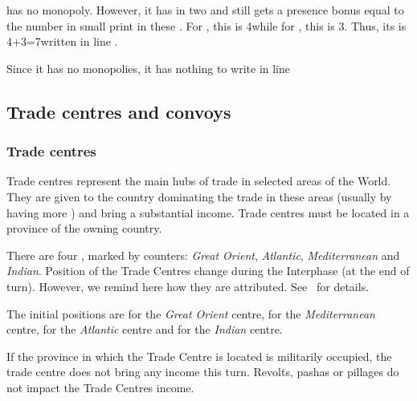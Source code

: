 \begin{exemple}
  \POR has no monopoly. However, it has \TradeFLEET in two \STZ and
  still gets a presence bonus equal to the number in small print in
  these \STZ. For , this is 4\ducats while for
  , this is 3\ducats. Thus, its  is 4+3=7\ducats written in line .

  Since it has no monopolies, it has nothing to write in line
\end{exemple}

\subsection{Trade centres and convoys}
\subsubsection{Trade centres}
\aparag Trade centres represent the main hubs of trade in selected areas
of the World. They are given to the country dominating the trade in
these areas (usually by having more \TradeFLEET) and bring a substantial
income. Trade centres must be located in a province of the owning
country.

\aparag There are four , marked by counters:
\emph{Great Orient}, \emph{Atlantic}, \emph{Mediterranean} and
\emph{Indian}.
\bparag Position of the Trade Centres change during the Interphase (at
the end of turn). However, we remind here how they are attributed.
See~ for details.

\aparag The initial positions are \provinceNil for the \emph{Great
  Orient} centre, \provinceVeneto for the \emph{Mediterranean} centre,
\provinceVlaandern for the \emph{Atlantic} centre and \villeDiu for
the \emph{Indian} centre.

\aparag If the province in which the Trade Centre is located is
militarily occupied, the trade centre does not bring any income this
turn.
\bparag Revolts, pashas or pillages do not impact the Trade Centres
income.

